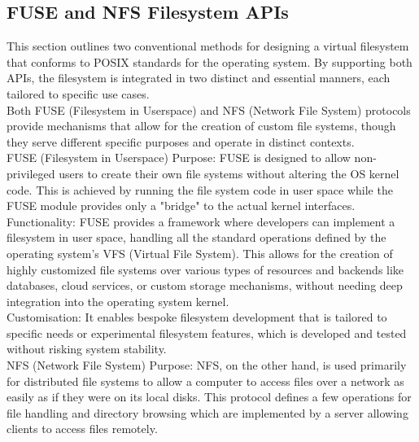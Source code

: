 \documentclass{tufte-handout}
\begin{document}
\subsection{FUSE and NFS Filesystem APIs}
This section outlines two conventional methods for designing a virtual filesystem that conforms to POSIX standards for the operating system.
By supporting both APIs, the filesystem is integrated in two distinct and essential manners, each tailored to specific use cases. \\
\vspace{10pt}
Both FUSE (Filesystem in Userspace) and NFS (Network File System) protocols provide mechanisms that allow for the creation of custom file
systems, though they serve different specific purposes and operate in distinct contexts.\\
\vspace{10pt}
FUSE (Filesystem in Userspace)
Purpose: FUSE is designed to allow non-privileged users to create their own file systems without altering the OS kernel code. This is achieved by
running the file system code in user space while the FUSE module provides only a "bridge" to the actual kernel interfaces.\\
\vspace{10pt}
Functionality: FUSE provides a framework where developers can implement a filesystem in user space, handling all the standard operations
defined by the operating system's VFS (Virtual File System). This allows for the creation of highly customized file systems over various
types of resources and backends like databases, cloud services, or custom storage mechanisms, without needing deep integration into the
operating system kernel.\\
\vspace{10pt}
Customisation: It enables bespoke filesystem development that is tailored to specific needs or experimental filesystem features,
which is developed and tested without risking system stability.\\
\vspace{10pt}
NFS (Network File System)
Purpose: NFS, on the other hand, is used primarily for distributed file systems to allow a computer to access files over a network as
easily as if they were on its local disks. This protocol defines a few operations for file handling and directory browsing which are
implemented by a server allowing clients to access files remotely.\\
\end{document}
